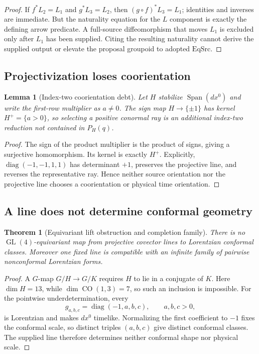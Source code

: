 \documentclass[11pt]{article}
\newtheorem{theorem}{Theorem}
\newtheorem{lemma}{Lemma}
\newcommand{\Span}{\operatorname{Span}}
\newcommand{\GL}{\operatorname{GL}}
\newcommand{\CO}{\operatorname{CO}}
\begin{document}
\begin{proof}
If $f^*L_2=L_1$ and $g^*L_3=L_2$, then
$(g\circ f)^*L_3=L_1$; identities and inverses are immediate.  But the
naturality equation for the $L$ component is exactly the defining arrow
predicate.  A full-source diffeomorphism that moves $L_1$ is excluded only
after $L_1$ has been supplied.  Citing the resulting naturality cannot derive
the supplied output or elevate the proposal groupoid to adopted
$\mathrm{EqSrc}$.
\end{proof}

\subsection{Projectivization loses coorientation}

\begin{lemma}[Index-two coorientation debt]
Let $H$ stabilize $\Span(dx^0)$ and write the first-row multiplier as
$a\ne0$.  The sign map $H\to\{\pm1\}$ has kernel
$H^+=\{a>0\}$, so selecting a positive conormal ray is an additional
index-two reduction not contained in $P_H(q)$.
\end{lemma}

\begin{proof}
The sign of the product multiplier is the product of signs, giving a
surjective homomorphism.  Its kernel is exactly $H^+$.  Explicitly,
$\operatorname{diag}(-1,-1,1,1)$ has determinant $+1$, preserves the
projective line, and reverses the representative ray.  Hence neither source
orientation nor the projective line chooses a coorientation or physical time
orientation.
\end{proof}

\subsection{A line does not determine conformal geometry}

\begin{theorem}[Equivariant lift obstruction and completion family]
There is no $\GL(4)$-equivariant map from projective covector lines to
Lorentzian conformal classes.  Moreover one fixed line is compatible with an
infinite family of pairwise nonconformal Lorentzian forms.
\end{theorem}

\begin{proof}
A $G$-map $G/H\to G/K$ requires $H$ to lie in a conjugate of $K$.
Here $\dim H=13$, while $\dim\CO(1,3)=7$, so such an inclusion is impossible.
For the pointwise underdetermination, every
\[
 g_{a,b,c}=\operatorname{diag}(-1,a,b,c),\qquad a,b,c>0,
\]
is Lorentzian and makes $dx^0$ timelike.  Normalizing the first coefficient to
$-1$ fixes the conformal scale, so distinct triples $(a,b,c)$ give distinct
conformal classes.  The supplied line therefore determines neither conformal
shape nor physical scale.
\end{proof}
\end{document}
